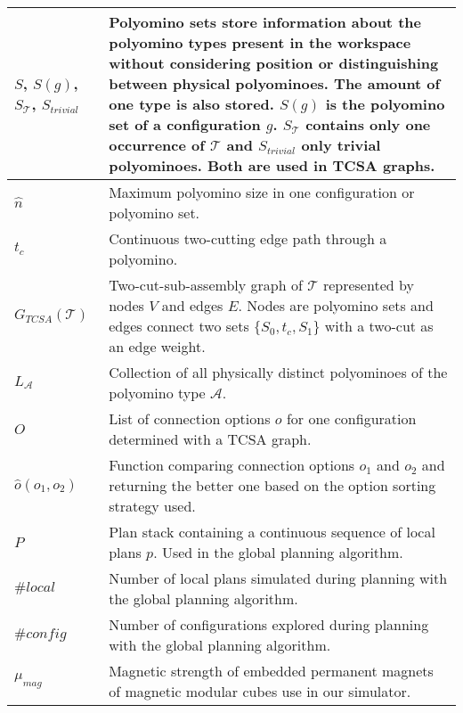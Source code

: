 \begin{xltabular}{\textwidth}{ l  X }
	$S$, $S(g)$, $S_\mathcal{T}$, $S_\textit{trivial}$
	&
	Polyomino sets store information about the polyomino types present in the workspace without considering position or distinguishing between physical polyominoes.
	The amount of one type is also stored.
	$S(g)$ is the polyomino set of a configuration $g$.
	$S_\mathcal{T}$ contains only one occurrence of $\mathcal{T}$ and $S_\textit{trivial}$ only trivial polyominoes.
	Both are used in TCSA graphs.
	\\ \midrule
	
	$\hat{n}$
	&
	Maximum polyomino size in one configuration or polyomino set.
	\\ \midrule
	
	$t_c$
	&
	Continuous two-cutting edge path through a polyomino.
	\\ \midrule
	
	$G_{\textit{TCSA}}(\mathcal{T})$
	&
	Two-cut-sub-assembly graph of $\mathcal{T}$ represented by nodes $V$ and edges $E$.
	Nodes are polyomino sets and edges connect two sets $\{S_0, t_c, S_1\}$ with a two-cut as an edge weight.
	\\ \midrule
	
	$L_\mathcal{A}$
	&
	Collection of all physically distinct polyominoes of the polyomino type $\mathcal{A}$.
	\\ \midrule
	
	$O$
	&
	List of connection options $o$ for one configuration determined with a TCSA graph.
	\\ \midrule
	
	$\hat{o}(o_1,o_2)$
	&
	Function comparing connection options $o_1$ and $o_2$ and returning the better one based on the option sorting strategy used.
	\\ \midrule
	
	$P$
	&
	Plan stack containing a continuous sequence of local plans $p$.
	Used in the global planning algorithm.
	\\ \midrule
	
	$\#\textit{local}$
	&
	Number of local plans simulated during planning with the global planning algorithm.
	\\ \midrule
	
	$\#\textit{config}$
	&
	Number of configurations explored during planning with the global planning algorithm.
	\\ \midrule
	
	$\mu_\textit{mag}$
	&
	Magnetic strength of embedded permanent magnets of magnetic modular cubes use in our simulator.
	\\ \midrule
	

\end{xltabular}
